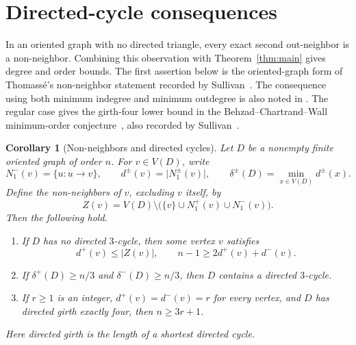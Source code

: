 \documentclass[11pt]{article}
\newtheorem{corollary}[theorem]{Corollary}
\theoremstyle{remark}
\newcommand{\abs}[1]{\lvert #1\rvert}
\begin{document}
\section{Directed-cycle consequences}\label{sec:directed-cycle-consequences}

In an oriented graph with no directed triangle, every exact second
out-neighbor is a non-neighbor.  Combining this observation with
Theorem~\ref{thm:main} gives degree and order bounds.
The first assertion below is the oriented-graph form of Thomass\'e's
non-neighbor statement recorded by
Sullivan~\cite[Conjecture~6.12]{Sullivan2006}.
The consequence using both minimum indegree and minimum outdegree is also
noted in \cite[Section~3]{Sullivan2006}.  The regular case gives the
girth-four lower bound in the Behzad--Chartrand--Wall minimum-order
conjecture~\cite{BehzadChartrandWall1970}, also recorded by
Sullivan~\cite[Section~4]{Sullivan2006}.

\begin{corollary}[Non-neighbors and directed cycles]\label{cor:directed-cycle-consequences}
Let \(D\) be a nonempty finite oriented graph of order \(n\).  For
\(v\in V(D)\), write
\[
 N_1^-(v)=\{u:u\to v\},\qquad
 d^\pm(v)=\abs{N_1^\pm(v)},\qquad
 \delta^\pm(D)=\min_{x\in V(D)}d^\pm(x).
\]
Define the non-neighbors of \(v\), excluding \(v\) itself, by
\[
 Z(v)=V(D)\setminus
 \bigl(\{v\}\cup N_1^+(v)\cup N_1^-(v)\bigr).
\]
Then the following hold.
\begin{enumerate}[label=\textup{(\roman*)}]
\item If \(D\) has no directed \(3\)-cycle, then some vertex \(v\) satisfies
\[
 d^+(v)\leq\abs{Z(v)},\qquad
 n-1\geq 2d^+(v)+d^-(v).
\]
\item If \(\delta^+(D)\geq n/3\) and \(\delta^-(D)\geq n/3\), then \(D\)
contains a directed \(3\)-cycle.
\item If \(r\geq1\) is an integer, \(d^+(v)=d^-(v)=r\) for every vertex,
and \(D\) has directed girth exactly four, then \(n\geq3r+1\).
\end{enumerate}
Here directed girth is the length of a shortest directed cycle.
\end{corollary}
\end{document}
